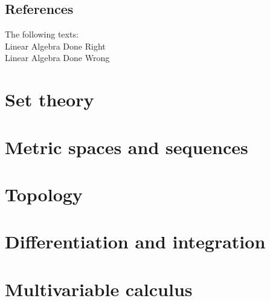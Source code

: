 \documentclass{article}
\begin{document}
\subsection{References}
The following texts: \\
Linear Algebra Done Right \cite{linalgright} \\
Linear Algebra Done Wrong \cite{linalgwrong}

\section{Set theory}

\section{Metric spaces and sequences}

\section{Topology}

\section{Differentiation and integration}

\section{Multivariable calculus}


\newpage

\printbibliography
\end{document}
